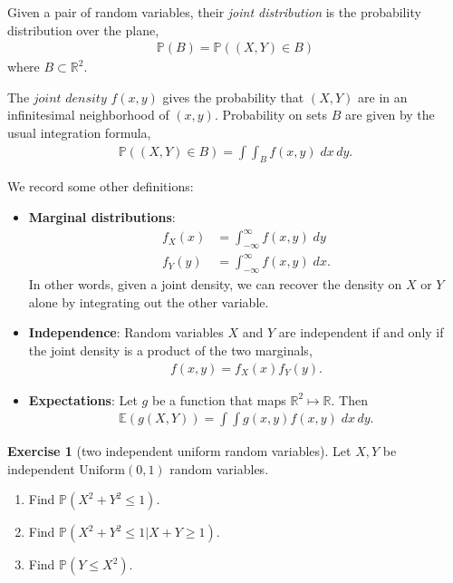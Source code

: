 \documentclass[11pt]{article}
\theoremstyle{definition}
\newtheorem{exercise}[]{Exercise}
\renewcommand{\P}{\mathbb{P}}
\newcommand{\E}{\mathbb{E}}
\newcommand{\R}{\mathbb{R}}
\begin{document}
Given a pair of random variables, their \textit{joint distribution} is the probability distribution over the plane,
\begin{align*}
  \P(B) = \P((X, Y) \in B)
\end{align*}
where $B\subset\R^2$.

The $\textit{joint density}$ $f(x, y)$ gives the
probability that $(X,Y)$ are in an
infinitesimal neighborhood of $(x, y)$. Probability
on sets $B$ are given by the usual integration formula,
\begin{align*}
  \P((X, Y)\in B) = \int\int_B f(x,y)\; dx\,dy.
\end{align*}

We record some other definitions:
\begin{itemize}
  \item \textbf{Marginal distributions}:
  \begin{align*}
    f_X(x) &= \int_{-\infty}^\infty f(x, y)\; dy \\
    f_Y(y) &= \int_{-\infty}^\infty f(x, y)\; dx.
  \end{align*}
  In other words, given a joint density, we can recover
  the density on $X$ or $Y$ alone by integrating out
  the other variable.
  \item \textbf{Independence}:
  Random variables $X$ and $Y$ are independent if and only if the joint density is a product of the two marginals,
  \begin{align*}
    f(x, y) = f_X(x) f_Y(y).
  \end{align*}
  \item \textbf{Expectations}: Let $g$ be a function that maps $\R^2\mapsto \R$. Then
  \begin{align*}
    \E(g(X, Y)) = \int\int g(x, y) f(x, y)\; dx\, dy.
  \end{align*}
\end{itemize}


\begin{exercise}[two independent uniform random variables]
Let $X, Y$ be independent $\text{Uniform}(0, 1)$ random variables.
\begin{enumerate}[label = (\alph*)]
  \item Find $\P(X^2 + Y^2 \leq 1)$.
  \item Find $\P(X^2 + Y^2 \leq 1 | X + Y \geq 1)$.
  \item Find $\P(Y \leq X^2)$.
\end{enumerate}
\end{exercise}
\end{document}
